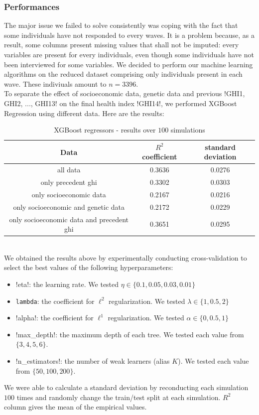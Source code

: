 \documentclass[]{article}
\begin{document}
\subsubsection{Performances}
The major issue we failed to solve consistently was coping with the fact that some individuals have not responded to every waves. It is a problem because, as a result, some columns present missing values that shall not be imputed: every variables are present for every individuals, even though some individuals have not been interviewed for some variables. We decided to perform our machine learning algorithms on the reduced dataset comprising only individuals present in each wave. These indiviuals amount to $n = 3396$.\\

\noindent
To separate the effect of socioeconomic data, genetic data and previous \pyth!GHI1, GHI2, ..., GHI13! on the final health index \pyth!GHI14!, we performed XGBoost Regression using different data. Here are the results:
\begin{table}[!h]
\centering
\begin{tabular}{|c|c|c|}
	\hline
	
	\textbf{Data} & \textbf{$R^2$ coefficient} & \textbf{standard deviation}\\
	\hline
	all data & 0.3636 & 0.0276\\ 
	\hline
	only precedent ghi & 0.3302 & 0.0303\\
	\hline 
	only socioeconomic data & 0.2167 & 0.0216\\
	\hline 
	only socioeconomic and genetic data & 0.2172 & 0.0229\\
	\hline 
	only socioeconomic data and precedent ghi & 0.3651 & 0.0295\\
	\hline 
\end{tabular}
\label{results_xgbregressor}
\caption{XGBoost regressors - results over $100$ simulations}
\end{table}\\
We obtained the results above by experimentally conducting cross-validation to select the best values of the following hyperparameters:
\begin{itemize}
	\item \pyth!eta!: the learning rate. We tested $\eta \in \{0.1, 0.05, 0.03, 0.01\}$
	\item \texttt{lambda}: the coefficient for $\ell^2$ regularization. We tested $\lambda \in \{1, 0.5, 2\}$
	\item \pyth!alpha!: the coefficient for $\ell^1$ regularization. We tested $\alpha \in \{0, 0.5, 1\}$
	\item \pyth!max_depth!: the maximum depth of each tree. We tested each value from $\{3, 4, 5, 6\}$.
	\item \pyth!n_estimators!: the number of weak learners (alias $K$). We tested each value from $\{50, 100, 200\}$.
\end{itemize}
We were able to calculate a standard deviation by reconducting each simulation $100$ times and randomly change the train/test split at each simulation. $R^2$ column gives the mean of the empirical values.\\
\end{document}
